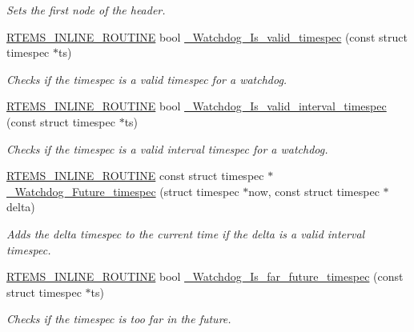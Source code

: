 \begin{DoxyCompactItemize}
\begin{DoxyCompactList}\small\item\em Sets the first node of the header. \end{DoxyCompactList}\item 
\mbox{\hyperlink{group__RTEMSScoreBaseDefs_gac216239df231d5dbd15e3520b0b9313f}{R\+T\+E\+M\+S\+\_\+\+I\+N\+L\+I\+N\+E\+\_\+\+R\+O\+U\+T\+I\+NE}} bool \mbox{\hyperlink{group__RTEMSScoreWatchdog_gacc1967581868e41a96cd0a3181b3e755}{\+\_\+\+Watchdog\+\_\+\+Is\+\_\+valid\+\_\+timespec}} (const struct timespec $\ast$ts)
\begin{DoxyCompactList}\small\item\em Checks if the timespec is a valid timespec for a watchdog. \end{DoxyCompactList}\item 
\mbox{\hyperlink{group__RTEMSScoreBaseDefs_gac216239df231d5dbd15e3520b0b9313f}{R\+T\+E\+M\+S\+\_\+\+I\+N\+L\+I\+N\+E\+\_\+\+R\+O\+U\+T\+I\+NE}} bool \mbox{\hyperlink{group__RTEMSScoreWatchdog_gaf50ac3de653d343784376b28e0cedf6a}{\+\_\+\+Watchdog\+\_\+\+Is\+\_\+valid\+\_\+interval\+\_\+timespec}} (const struct timespec $\ast$ts)
\begin{DoxyCompactList}\small\item\em Checks if the timespec is a valid interval timespec for a watchdog. \end{DoxyCompactList}\item 
\mbox{\hyperlink{group__RTEMSScoreBaseDefs_gac216239df231d5dbd15e3520b0b9313f}{R\+T\+E\+M\+S\+\_\+\+I\+N\+L\+I\+N\+E\+\_\+\+R\+O\+U\+T\+I\+NE}} const struct timespec $\ast$ \mbox{\hyperlink{group__RTEMSScoreWatchdog_ga1bc0554fdaf14c4a01c4a1bc15ddca48}{\+\_\+\+Watchdog\+\_\+\+Future\+\_\+timespec}} (struct timespec $\ast$now, const struct timespec $\ast$delta)
\begin{DoxyCompactList}\small\item\em Adds the delta timespec to the current time if the delta is a valid interval timespec. \end{DoxyCompactList}\item 
\mbox{\hyperlink{group__RTEMSScoreBaseDefs_gac216239df231d5dbd15e3520b0b9313f}{R\+T\+E\+M\+S\+\_\+\+I\+N\+L\+I\+N\+E\+\_\+\+R\+O\+U\+T\+I\+NE}} bool \mbox{\hyperlink{group__RTEMSScoreWatchdog_ga4a4b8259c75b05f8510121d3c77cf242}{\+\_\+\+Watchdog\+\_\+\+Is\+\_\+far\+\_\+future\+\_\+timespec}} (const struct timespec $\ast$ts)
\begin{DoxyCompactList}\small\item\em Checks if the timespec is too far in the future. \end{DoxyCompactList}\item 

\end{DoxyCompactItemize}
